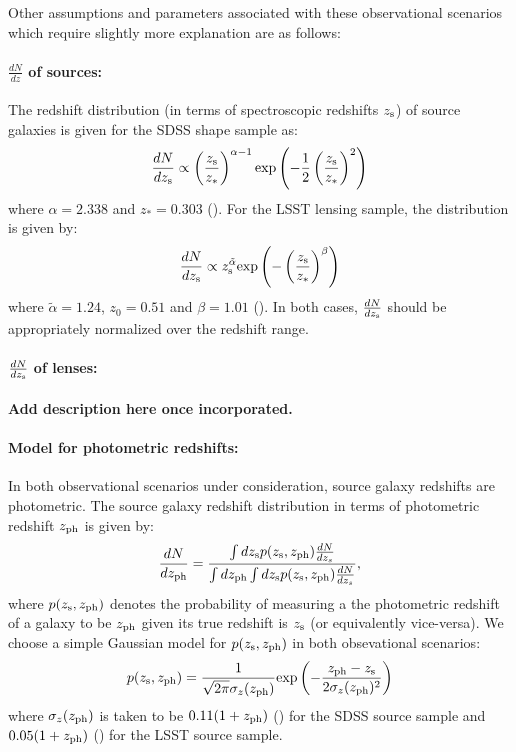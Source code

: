 \documentclass[a4paper,fleqn,usenatbib]{mnras}
\begin{document}
Other assumptions and parameters associated with these observational scenarios which require slightly more explanation are as follows:
\paragraph*{$\frac{dN}{dz}$ of sources:}The redshift distribution (in terms of spectroscopic redshifts $z_{\rm s}$) of source galaxies is given for the SDSS shape sample as:
\begin{equation}
\frac{dN}{dz_{\rm s}} \propto \left(\frac{z_{\rm s}}{z_*}\right)^{\alpha-1} {\rm exp}\left(-\frac{1}{2}\left(\frac{z_{\rm s}}{z_*}\right)^2\right)
\label{dndz_sdss_source}
\end{equation}
where $\alpha=2.338$ and $z_*=0.303$ (\cite{Nakajima2011}). For the LSST lensing sample, the distribution is given by:
\begin{equation}
\frac{dN}{dz_{\rm s}} \propto z_{\rm s}^{\tilde{\alpha}} {\rm exp}\left(-\left(\frac{z_{\rm s}}{z_*}\right)^\beta\right)
\label{dndz_lsst_sources}
\end{equation}
where $\tilde{\alpha}=1.24$, $z_0=0.51$ and $\beta=1.01$ (\cite{Chang2013}). In both cases, $\frac{dN}{dz_{\rm s}}$ should be appropriately normalized over the redshift range.
\paragraph*{$\frac{dN}{dz_{\rm s}}$ of lenses:} {\bf Add description here once incorporated.}
\paragraph*{Model for photometric redshifts:} In both observational scenarios under consideration, source galaxy redshifts are photometric. The source galaxy redshift distribution in terms of photometric redshift $z_{\rm ph}$ is given by:
\begin{equation}
\frac{dN}{dz_{\rm ph}} = \frac{\int dz_{\rm s} p(z_{\rm s}, z_{\rm ph}) \frac{dN}{dz_s}}{\int dz_{\rm ph} \int dz_{\rm s} p(z_{\rm s}, z_{\rm ph}) \frac{dN}{dz_s}},
\label{photoz_dndz}
\end{equation}
where $p(z_{\rm s}, z_{\rm ph})$ denotes the probability of measuring a the photometric redshift of a galaxy to be $z_{\rm ph}$ given its true redshift is $z_{\rm s}$ (or equivalently vice-versa). We choose a simple Gaussian model for $p(z_{\rm s}, z_{\rm ph})$ in both obsevational scenarios:
\begin{equation}
p(z_{\rm s}, z_{\rm ph}) = \frac{1}{\sqrt{2\pi}\sigma_z(z_{\rm ph})} {\rm exp}\left(-\frac{z_{\rm ph} - z_{\rm s}}{2 \sigma_z(z_{\rm ph})^2} \right)
\label{pzph}
\end{equation}
where $\sigma_z(z_{\rm ph})$ is taken to be $0.11(1+z_{\rm ph})$ (\cite{Blazek2012}) for the SDSS source sample and $0.05(1+z_{\rm ph})$ (\cite{Chang2013}) for the LSST source sample.
\end{document}
